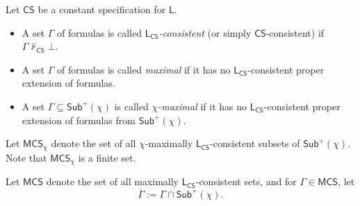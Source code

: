 \documentclass[envcountsect,envcountsame,oribibl,orivec]{llncs}
\newcommand{\CS}{\textsf{CS}}
\newcommand{\Sub}{\mathsf{Sub}}
\newcommand{\MCS}{\mathsf{MCS}}
\begin{document}
\begin{definition}
	Let $\CS$ be a constant specification for $\mathsf{L}$.
	\begin{itemize}
		\item A set $\Gamma$ of formulas is called \emph{$\mathsf{L}_\CS$-consistent} (or simply $\CS$-consistent) if $\Gamma \not\vdash_\CS \bot$.
		
		\item A set $\Gamma$ of formulas is called \textit{maximal} if it has no $\mathsf{L}_\CS$-consistent proper extension of formulas.
		
		\item A set $\Gamma \subseteq \Sub^+(\chi)$  is called \textit{$\chi$-maximal} if it has no $\mathsf{L}_\CS$-consistent proper extension of formulas from $\Sub^+(\chi)$.
	\end{itemize}
	 

\end{definition} 

Let $\MCS_\chi$ denote the set of all $\chi$-maximally $\mathsf{L}_\CS$-consistent subsets of $\Sub^+(\chi)$. Note that $\MCS_\chi$ is a finite set.

Let $\MCS$ denote the set of all maximally $\mathsf{L}_\CS$-consistent sets, and for $\Gamma\in \MCS$, let $$\overline{\Gamma} := \Gamma \cap \Sub^+(\chi).$$ 
\end{document}
